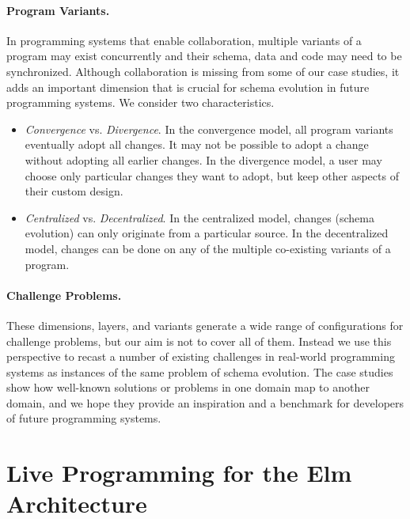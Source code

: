 \documentclass[english,submission]{programming}
\begin{document}
\paragraph{Program Variants.}
In programming systems that enable collaboration, multiple variants of a program may exist
concurrently and their schema, data and code may need to be synchronized. Although collaboration
is missing from some of our case studies, it adds an important dimension that is crucial for
schema evolution in future programming systems. We consider two characteristics.

\begin{itemize}
\item \emph{Convergence} vs. \emph{Divergence}. In the convergence model, all program variants
  eventually adopt all changes. It may not be possible to adopt a change without adopting
  all earlier changes. In the divergence model, a user may choose only
  particular changes they want to adopt, but keep other aspects of their custom design.
\item \emph{Centralized} vs. \emph{Decentralized}. In the centralized model, changes (schema evolution) can only originate from a particular source. In the decentralized model,
  changes can be done on any of the multiple co-existing variants of a program.
\end{itemize}

\paragraph{Challenge Problems.}
These dimensions, layers, and variants generate a wide range of configurations for challenge problems, but
our aim is not to cover all of them. Instead we use this perspective to recast a number of
existing challenges in real-world programming systems as instances of the same problem of
schema evolution. The case studies show how well-known solutions or problems in one domain
map to another domain, and we hope they provide an inspiration and a benchmark for
developers of future programming systems.


\section{Live Programming for the Elm Architecture}
\label{sec:elm}
\end{document}
